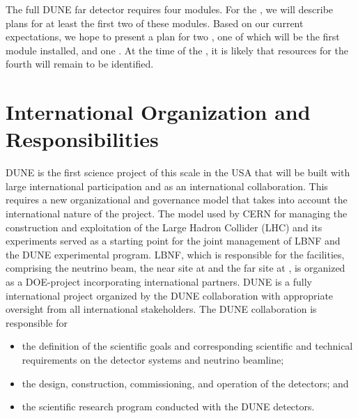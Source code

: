 The full DUNE far detector requires four modules. For the , we will describe plans for at least the first two of these modules. Based on our current expectations, we hope to present a plan for two , one of which will be the first module installed, and one . At the time of the , it is likely that resources for the fourth  will remain to be identified. 


\section{International Organization and Responsibilities}

DUNE is the first science project of this scale in the USA that will be built with large
international participation and as an international collaboration. This requires a new organizational and governance model that takes into account the international nature of the project.
The
model used by CERN for managing the construction and exploitation of the Large Hadron Collider (LHC) and its experiments served as a starting point for the joint management of LBNF and the DUNE experimental program. 
LBNF, which is responsible for the facilities, comprising the neutrino beam, the near site at \fnal and the far site at \surf, is organized as a
DOE-\fnal project incorporating international partners. 
DUNE is a fully international project
organized by the DUNE collaboration with appropriate oversight from all international stakeholders.
The DUNE collaboration is responsible for
\begin{itemize}
\item the definition of the scientific goals and corresponding scientific and technical requirements on the detector systems and neutrino beamline;
\item the design, construction, commissioning, and operation of the detectors; and
\item the scientific research program conducted with the DUNE detectors. 
\end{itemize}


